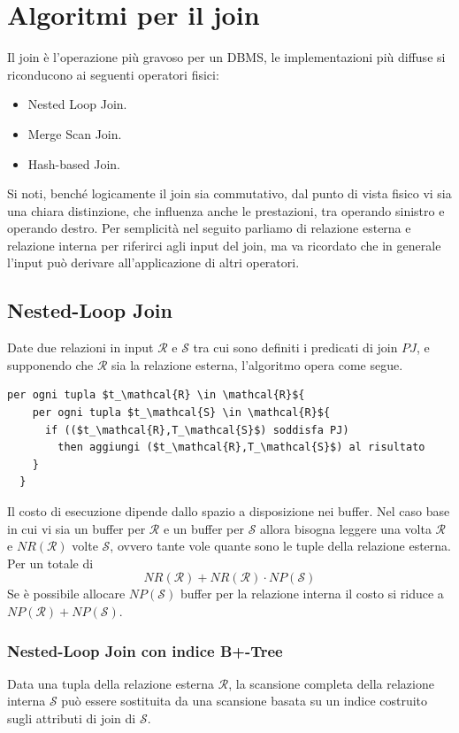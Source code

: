 \documentclass[oneside,a4paper,11pt]{book}
\theoremstyle{italicstyle}
\theoremstyle{normStyle}
\begin{document}
\section{Algoritmi per il join}
Il join è l'operazione più gravoso per un DBMS, le implementazioni più diffuse 
si riconducono ai seguenti operatori fisici:
\begin{itemize}
  \item Nested Loop Join.
  \item Merge Scan Join.
  \item Hash-based Join.
\end{itemize}
Si noti, benché logicamente il join sia commutativo, dal punto di vista fisico 
vi sia una chiara distinzione, che influenza anche le prestazioni, tra operando sinistro e operando 
destro. Per semplicità nel seguito parliamo di relazione esterna e relazione 
interna per riferirci agli input del join, ma va ricordato che in generale l'input 
può derivare all'applicazione di altri operatori.
\subsection{Nested-Loop Join}
Date due relazioni in input $\mathcal{R}$ e $\mathcal{S}$ tra cui sono definiti i predicati di join 
$PJ$, e supponendo che $\mathcal{R}$ sia la relazione esterna, l'algoritmo opera come segue.
\begin{lstlisting}[mathescape]
  per ogni tupla $t_\mathcal{R} \in \mathcal{R}${
    per ogni tupla $t_\mathcal{S} \in \mathcal{R}${
      if (($t_\mathcal{R},T_\mathcal{S}$) soddisfa PJ)
        then aggiungi ($t_\mathcal{R},T_\mathcal{S}$) al risultato
    }
  }
\end{lstlisting}
Il costo di esecuzione dipende dallo spazio a disposizione nei buffer.
Nel caso base in cui vi sia un buffer per $\mathcal{R}$ e un buffer per $\mathcal{S}$
allora bisogna leggere una volta $\mathcal{R}$ e $NR(\mathcal{R})$ volte $\mathcal{S}$,
ovvero tante vole quante sono le tuple della relazione esterna.
Per un totale di 
\[
  NR(\mathcal{R}) + NR(\mathcal{R}) \cdot NP(\mathcal{S})
\]
Se è possibile allocare $NP(\mathcal{S})$ buffer per la relazione interna il costo si riduce a 
$NP(\mathcal{R}) + NP(\mathcal{S})$.
\subsubsection{Nested-Loop Join con indice B+-Tree}
Data una tupla della relazione esterna $\mathcal{R}$, la scansione completa della relazione interna 
$\mathcal{S}$ può essere sostituita da una scansione basata su un indice costruito sugli attributi 
di join di $\mathcal{S}$.
\end{document}
